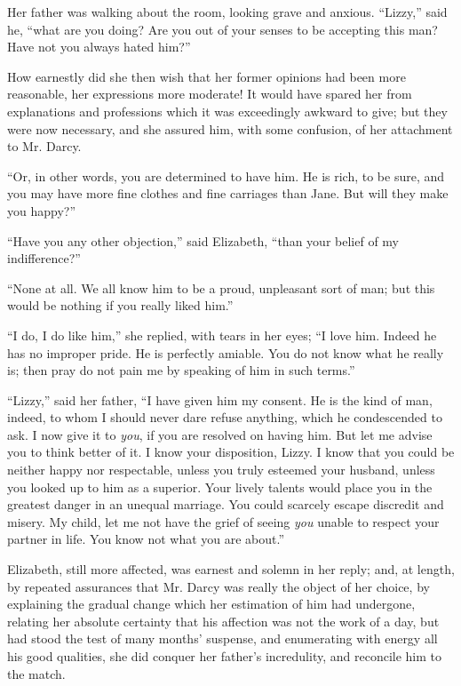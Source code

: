 Her father was walking about the room, looking grave and anxious. ``Lizzy,'' said he, ``what are you doing? Are you out of your senses to be accepting this man? Have not you always hated him?''

How earnestly did she then wish that her former opinions had been more reasonable, her expressions more moderate! It would have spared her from explanations and professions which it was exceedingly awkward to give; but they were now necessary, and she assured him, with some confusion, of her attachment to Mr. Darcy.

``Or, in other words, you are determined to have him. He is rich, to be sure, and you may have more fine clothes and fine carriages than Jane. But will they make you happy?''

``Have you any other objection,'' said Elizabeth, ``than your belief of my indifference?''

``None at all. We all know him to be a proud, unpleasant sort of man; but this would be nothing if you really liked him.''

``I do, I do like him,'' she replied, with tears in her eyes; ``I love him. Indeed he has no improper pride. He is perfectly amiable. You do not know what he really is; then pray do not pain me by speaking of him in such terms.''

``Lizzy,'' said her father, ``I have given him my consent. He is the kind of man, indeed, to whom I should never dare refuse anything, which he condescended to ask. I now give it to \textit{you}, if you are resolved on having him. But let me advise you to think better of it. I know your disposition, Lizzy. I know that you could be neither happy nor respectable, unless you truly esteemed your husband, unless you looked up to him as a superior. Your lively talents would place you in the greatest danger in an unequal marriage. You could scarcely escape discredit and misery. My child, let me not have the grief of seeing \textit{you} unable to respect your partner in life. You know not what you are about.''

Elizabeth, still more affected, was earnest and solemn in her reply; and, at length, by repeated assurances that Mr. Darcy was really the object of her choice, by explaining the gradual change which her estimation of him had undergone, relating her absolute certainty that his affection was not the work of a day, but had stood the test of many months' suspense, and enumerating with energy all his good qualities, she did conquer her father's incredulity, and reconcile him to the match.

